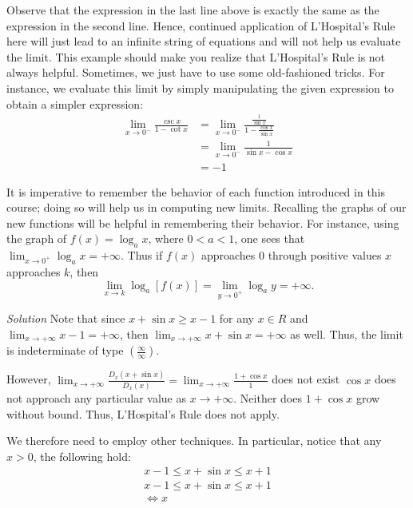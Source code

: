 \documentclass[
  letterpaper,
  DIV=11,
  numbers=noendperiod]{scrartcl}
\theoremstyle{plain}
\theoremstyle{remark}
\begin{document}
Observe that the expression in the last line above is exactly the same
as the expression in the second line. Hence, continued application of
L'Hospital's Rule here will just lead to an infinite string of equations
and will not help us evaluate the limit. This example should make you
realize that L'Hospital's Rule is not always helpful. Sometimes, we just
have to use some old-fashioned tricks. For instance, we evaluate this
limit by simply manipulating the given expression to obtain a simpler
expression: \[
\begin{aligned}
\displaystyle\lim_{x \to 0^-}\frac{\csc x}{1-\cot x}&=\displaystyle\lim_{x \to 0^-}\frac{\frac{1}{\sin x}}{1-\frac{\cos x}{\sin x}}\\&=\displaystyle\lim_{x \to 0^-}\frac{1}{\sin x-\cos x}\\&=-1
\end{aligned}
\]

It is imperative to remember the behavior of each function introduced in
this course; doing so will help us in computing new limits. Recalling
the graphs of our new functions will be helpful in remembering their
behavior. For instance, using the graph of \(f(x)=\log_a x\), where
\(0\lt a \lt 1\), one sees that
\(\displaystyle\lim_{x \to 0^+}\log_a x=+\infty\). Thus if \(f(x)\)
approaches \(0\) through positive values \(x\) approaches \(k\), then \[
\displaystyle\lim_{x \to k}\log_a[f(x)]=\displaystyle\lim_{y \to 0^+}\log_a y=+\infty.
\]

\leavevmode{}%
\emph{Solution} Note that since \(x+\sin x \ge x - 1\) for any
\(x \in R\) and \(\displaystyle\lim_{x \to +\infty} {x-1=+\infty}\),
then \(\displaystyle\lim_{x \to +\infty}{x + \sin x = +\infty}\) as
well. Thus, the limit is indeterminate of type
\(\left(\frac{\infty}{\infty}\right)\).

However,
\(\displaystyle\lim_{x \to +\infty}{\frac{D_x(x+\sin x)}{D_x(x)}=\displaystyle\lim_{x \to +\infty}\frac{1+\cos x}{1}}\)
does not exist \(\cos x\) does not approach any particular value as
\(x\to +\infty\). Neither does \(1+\cos x\) grow without bound. Thus,
L'Hospital's Rule does not apply.

We therefore need to employ other techniques. In particular, notice that
any \(x\gt 0\), the following hold: \[
\begin{aligned}
x-1 \le x+\sin x \le x+1 \\
x-1 \le x+\sin x \le x+1\\
\iff x
\end{aligned}
\]
\end{document}
